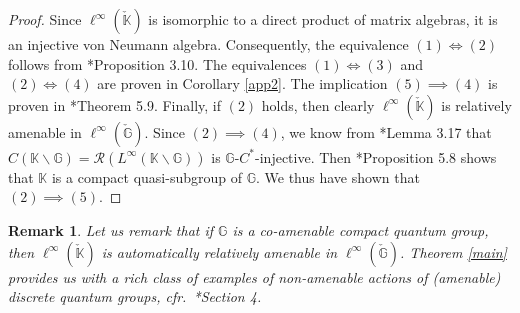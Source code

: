\documentclass[reqno]{amsart}
\numberwithin{equation}{section}
\newtheorem{Rem}[Theorem]{Remark}
\newcommand{\G}{\mathbb{G}}
\begin{document}
\begin{proof}
    Since $\ell^\infty(\check{\mathbb{K}})$ is isomorphic to a direct product of matrix algebras, it is an injective von Neumann algebra. Consequently, the equivalence $(1)\iff (2)$ follows from \cite{DR24a}*{Proposition 3.10}. The equivalences $(1) \iff (3)$ and $(2) \iff (4)$ are proven in Corollary \ref{app2}. The implication $(5)\implies (4)$ is proven in \cite{AK24}*{Theorem 5.9}. Finally, if $(2)$ holds, then clearly $\ell^\infty(\check{\mathbb{K}})$ is relatively amenable in $\ell^\infty(\check{\G})$. Since $(2)\implies (4)$, we know from \cite{DH24}*{Lemma 3.17} that $C(\mathbb{K}\backslash \G)= \mathcal{R}(L^\infty(\mathbb{K}\backslash \G))$ is $\G$-$C^*$-injective. Then \cite{AK24}*{Proposition 5.8} shows that $\mathbb{K}$ is a compact quasi-subgroup of $\G$. We thus have shown that $(2)\implies (5)$.
    \end{proof}


\begin{Rem} Let us remark that if $\mathbb{G}$ is a co-amenable compact quantum group, then $\ell^\infty(\check{\mathbb{K}})$ is automatically relatively amenable in $\ell^\infty(\check{\G})$. Theorem \ref{main} provides us with a rich class of examples of non-amenable actions of (amenable) discrete quantum groups, cfr.\ \cite{DCDR24b}*{Section 4}. \end{Rem}
\end{document}
